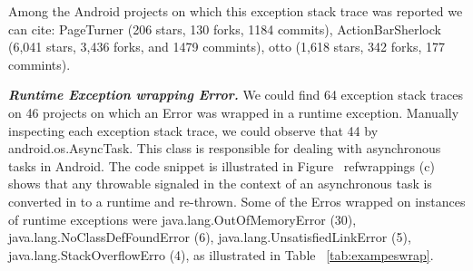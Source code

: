 \documentclass[conference]{IEEEtran}
\begin{document}
Among the Android projects on which this exception stack trace was reported we can cite:
PageTurner (206 stars, 130 forks, 1184 commits), ActionBarSherlock (6,041 stars, 
3,436 forks, and 1479 commints), otto (1,618 stars,	342 forks, 	177 commints).





\emph{\textbf{Runtime Exception wrapping Error.}} We could find  64 exception stack traces 
on 46 projects on which an Error was wrapped in a runtime exception.
Manually inspecting each exception stack trace, we could observe that 44%
by android.os.AsyncTask. This class is responsible for dealing with asynchronous tasks in Android.
The code snippet is illustrated in Figure ~ref{wrappings} (c) shows that any throwable signaled in the context of an asynchronous 
task is converted in to a runtime and re-thrown. Some of the Erros wrapped on instances of runtime exceptions were 
java.lang.OutOfMemoryError (30), java.lang.NoClassDefFoundError (6), 
java.lang.UnsatisfiedLinkError (5), java.lang.StackOverflowErro (4), as illustrated in Table ~\ref{tab:exampeswrap}.
\end{document}
